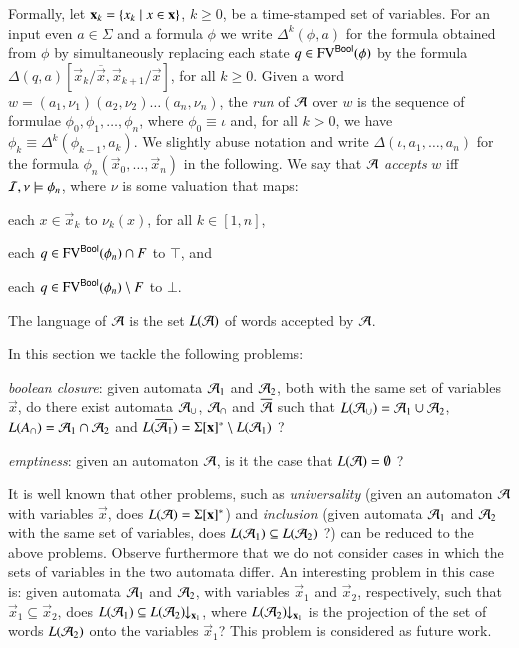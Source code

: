 \documentclass{llncs}
\begin{document}
Formally, let $\mathbf x_k = \left\{ x_k \mid x \in \mathbf x \right\}$, $k\geq0$, be
a time-stamped set of variables. For an input even $a \in \Sigma$ and
a formula $\phi$ we write $\Delta^k(\phi,a)$ for the formula obtained
from $\phi$ by simultaneously replacing each state $q \in
\mathrm{FV}^{\mathsf{Bool}}(\phi)$ by the formula
$\Delta(q,a)[\vec{x}_k/\overline{\vec{x}},\vec{x}_{k+1}/\vec{x}]$, for
all $k\geq0$. Given a word $w = (a_1,\nu_1)(a_2,\nu_2) \ldots
(a_n,\nu_n)$, the \emph{run} of $\mathcal{A}$ over $w$ is the sequence of
formulae $\phi_0,\phi_1,\ldots,\phi_n$, where $\phi_0 \equiv \iota$
and, for all $k > 0$, we have $\phi_k \equiv
\Delta^k(\phi_{k-1},a_k)$. We slightly abuse notation and write
$\Delta(\iota,a_1,\ldots,a_n)$ for the formula
$\phi_n(\vec{x}_0,\ldots,\vec{x}_n)$ in the following. We say that
$\mathcal{A}$ \emph{accepts} $w$ iff $\mathcal{I},\nu \models \phi_n$, where $\nu$ is
some valuation that maps:\begin{inparaenum}[(1)]
%
\item each $x \in \vec{x}_k$ to $\nu_k(x)$, for all $k\in[1,n]$, 
%
\item each $q \in \mathrm{FV}^{\mathsf{Bool}}(\phi_n) \cap F$ to $\top$, and 
%
\item each $q \in \mathrm{FV}^{\mathsf{Bool}}(\phi_n) \setminus F$ to $\bot$.
\end{inparaenum}
The language of $\mathcal{A}$ is the set $L(\mathcal{A})$ of words accepted by $\mathcal{A}$.

In this section we tackle the following problems: \begin{compactenum}
\item \emph{boolean closure}: given automata $\mathcal{A}_1$ and $\mathcal{A}_2$, both
  with the same set of variables $\vec{x}$, do there exist automata
  $\mathcal{A}_\cup$, $\mathcal{A}_\cap$ and $\overline{\mathcal{A}}$ such that $L(\mathcal{A}_\cup) =
  \mathcal{A}_1 \cup \mathcal{A}_2$, $L(A_\cap) = \mathcal{A}_1 \cap \mathcal{A}_2$ and
  $L(\overline{\mathcal{A}_1}) = \Sigma[\mathbf x]^* \setminus L(\mathcal{A}_1)$ ?
%
\item \emph{emptiness}: given an automaton $\mathcal{A}$, is it the case that
  $L(\mathcal{A}) = \emptyset$ ?
\end{compactenum}

It is well known that other problems, such as \emph{universality}
(given an automaton $\mathcal{A}$ with variables $\vec{x}$, does $L(\mathcal{A}) =
\Sigma[\mathbf x]^*$) and \emph{inclusion} (given automata $\mathcal{A}_1$ and
$\mathcal{A}_2$ with the same set of variables, does $L(\mathcal{A}_1) \subseteq
L(\mathcal{A}_2)$ ?) can be reduced to the above problems. Observe furthermore
that we do not consider cases in which the sets of variables in the
two automata differ. An interesting problem in this case is: given
automata $\mathcal{A}_1$ and $\mathcal{A}_2$, with variables $\vec{x}_1$ and
$\vec{x}_2$, respectively, such that $\vec{x}_1 \subseteq \vec{x}_2$,
does $L(\mathcal{A}_1) \subseteq {L(\mathcal{A}_2)}\!\!\downarrow_{{\mathbf x_1}}$, where
${L(\mathcal{A}_2)}\!\!\downarrow_{{\mathbf x_1}}$ is the projection of the set of words
$L(\mathcal{A}_2)$ onto the variables $\vec{x}_1$? This problem is considered
as future work.
\end{document}
